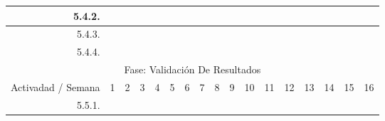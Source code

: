 \documentclass[12pt]{article}
\begin{document}
\begin{table}[H]
{\begin{tabular}{|rllllllllllllllll|}
        \multicolumn{1}{|r|}{5.4.2.} & \multicolumn{1}{l|}{} & \multicolumn{1}{l|}{} & \multicolumn{1}{l|}{} & \multicolumn{1}{l|}{} & \multicolumn{1}{l|}{} & \multicolumn{1}{l|}{} & \multicolumn{1}{l|}{} & \multicolumn{1}{l|}{} & \multicolumn{1}{l|}{} & \multicolumn{1}{l|}{} & \multicolumn{1}{c|}{\cellcolor[HTML]{B4A7D6}} & \multicolumn{1}{c|}{\cellcolor[HTML]{B4A7D6}} & \multicolumn{1}{c|}{\cellcolor[HTML]{EA9999}} & \multicolumn{1}{l|}{} & \multicolumn{1}{l|}{} &  \\ \hline
        \multicolumn{1}{|r|}{5.4.3.} & \multicolumn{1}{l|}{} & \multicolumn{1}{l|}{} & \multicolumn{1}{l|}{} & \multicolumn{1}{l|}{} & \multicolumn{1}{l|}{} & \multicolumn{1}{l|}{} & \multicolumn{1}{l|}{} & \multicolumn{1}{l|}{} & \multicolumn{1}{l|}{} & \multicolumn{1}{c|}{\cellcolor[HTML]{B4A7D6}} & \multicolumn{1}{c|}{\cellcolor[HTML]{B4A7D6}} & \multicolumn{1}{c|}{\cellcolor[HTML]{B4A7D6}} & \multicolumn{1}{c|}{\cellcolor[HTML]{EA9999}} & \multicolumn{1}{l|}{} & \multicolumn{1}{l|}{} &  \\ \hline
        \multicolumn{1}{|r|}{5.4.4.} & \multicolumn{1}{l|}{} & \multicolumn{1}{l|}{} & \multicolumn{1}{l|}{} & \multicolumn{1}{l|}{} & \multicolumn{1}{l|}{} & \multicolumn{1}{l|}{} & \multicolumn{1}{l|}{} & \multicolumn{1}{l|}{} & \multicolumn{1}{l|}{} & \multicolumn{1}{l|}{} & \multicolumn{1}{l|}{} & \multicolumn{1}{l|}{} & \multicolumn{1}{c|}{\cellcolor[HTML]{EA9999}} & \multicolumn{1}{l|}{} & \multicolumn{1}{l|}{} &  \\ \hline
        \multicolumn{17}{|c|}{\cellcolor[HTML]{D9D9D9}Fase: Validación De Resultados} \\ \hline
        \multicolumn{1}{|l|}{\cellcolor[HTML]{D9D9D9}Activadad / Semana} & \multicolumn{1}{c|}{\cellcolor[HTML]{B6D7A8}1} & \multicolumn{1}{c|}{\cellcolor[HTML]{B6D7A8}2} & \multicolumn{1}{c|}{\cellcolor[HTML]{B6D7A8}3} & \multicolumn{1}{c|}{\cellcolor[HTML]{B6D7A8}4} & \multicolumn{1}{c|}{\cellcolor[HTML]{A4C2F4}5} & \multicolumn{1}{c|}{\cellcolor[HTML]{A4C2F4}6} & \multicolumn{1}{c|}{\cellcolor[HTML]{A4C2F4}7} & \multicolumn{1}{c|}{\cellcolor[HTML]{A4C2F4}8} & \multicolumn{1}{c|}{\cellcolor[HTML]{B4A7D6}9} & \multicolumn{1}{c|}{\cellcolor[HTML]{B4A7D6}10} & \multicolumn{1}{c|}{\cellcolor[HTML]{B4A7D6}11} & \multicolumn{1}{c|}{\cellcolor[HTML]{B4A7D6}12} & \multicolumn{1}{c|}{\cellcolor[HTML]{EA9999}13} & \multicolumn{1}{c|}{\cellcolor[HTML]{EA9999}14} & \multicolumn{1}{c|}{\cellcolor[HTML]{EA9999}15} & \multicolumn{1}{c|}{\cellcolor[HTML]{EA9999}16} \\ \hline
        \multicolumn{1}{|r|}{5.5.1.} & \multicolumn{1}{l|}{} & \multicolumn{1}{l|}{} & \multicolumn{1}{l|}{} & \multicolumn{1}{l|}{} & \multicolumn{1}{l|}{} & \multicolumn{1}{l|}{} & \multicolumn{1}{l|}{} & \multicolumn{1}{l|}{} & \multicolumn{1}{l|}{} & \multicolumn{1}{l|}{} & \multicolumn{1}{l|}{} & \multicolumn{1}{c|}{\cellcolor[HTML]{B4A7D6}} & \multicolumn{1}{c|}{\cellcolor[HTML]{B4A7D6}} & \multicolumn{1}{l|}{} & \multicolumn{1}{l|}{} &  \\ \hline

\end{tabular}}
\end{table}
\end{document}
